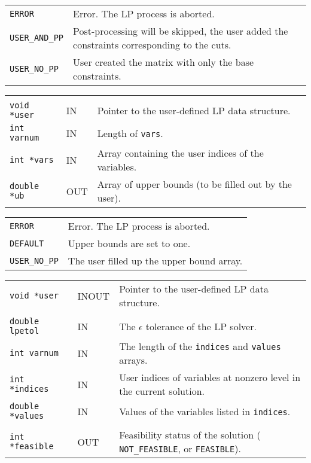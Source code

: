 \documentclass[twoside,11pt]{article}
\begin{document}
{\newpage
\clearpage
\samepage \begin{tabular}{lp{330pt}}
{\tt ERROR} & Error. The LP process is aborted. \\ 
{\tt USER\_AND\_PP} & Post-processing will be skipped, the user added the
constraints corresponding to the cuts. \\ 
{\tt USER\_NO\_PP} & User created the matrix with only the base constraints. \\ 
\end{tabular}
}

{\newpage
\clearpage
\samepage \begin{tabular}{llp{250pt}}
& & \\ 
{\tt void *user} & IN & Pointer to the user-defined LP data structure. \\ 

{\tt int varnum} & IN & Length of {\tt vars}. \\ 
{\tt int *vars} & IN & Array containing the user indices of the variables. \\ 
{\tt double *ub} & OUT & Array of upper bounds (to be filled out by
the user).
\\ 
\end{tabular}
}

{\newpage
\clearpage
\samepage \begin{tabular}{lp{300pt}}
{\tt ERROR} & Error. The LP process is aborted. \\  
{\tt DEFAULT} & Upper bounds are set to one. \\  
{\tt USER\_NO\_PP} & The user filled up the upper bound array. \\ 
\end{tabular}
}

{\newpage
\clearpage
\samepage \begin{tabular}{llp{265pt}}
{\tt void *user} & INOUT & Pointer to the user-defined LP data structure. \\ 
& & \\ 
{\tt double lpetol} & IN & The $\epsilon$ tolerance of the LP solver. \\ 
{\tt int varnum} & IN & The length of the {\tt indices} and {\tt values}
arrays.\\  
{\tt int *indices} & IN & User indices of variables at nonzero level in the
current solution.\\  
{\tt double *values} & IN & Values of the variables listed in {\tt indices}.\\ 
& & \\ 
{\tt int *feasible} & OUT & Feasibility status of the solution ({\tt
NOT\_FEASIBLE}, or {\tt FEASIBLE}). \\ 
\end{tabular}
}
\end{document}
